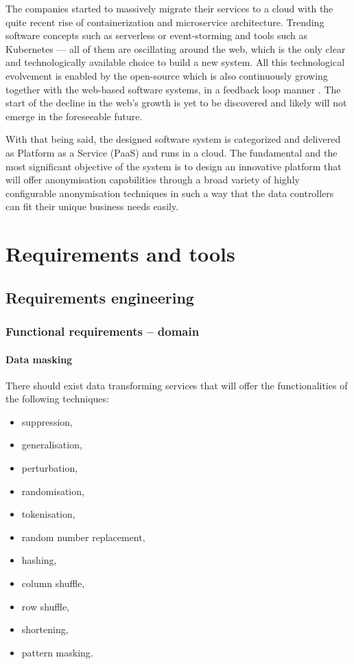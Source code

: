 \documentclass[a4paper,twoside,12pt]{book}
\begin{document}
The companies started to massively migrate their services to a cloud with the quite recent rise of containerization and microservice architecture. Trending software concepts such as serverless or event-storming and tools such as Kubernetes — all of them are oscillating around the web, which is the only clear and technologically available choice to build a new system. All this technological evolvement is enabled by the open-source which is also continuously growing together with the web-based software systems, in a feedback loop manner \cite{bib:distributed_systems}. The start of the decline in the web's growth is yet to be discovered and likely will not emerge in the foreseeable future.

With that being said, the designed software system is categorized and delivered as Platform as a Service (PaaS) and runs in a cloud. The fundamental and the most significant objective of the system is to design an innovative platform that will offer anonymisation capabilities through a broad variety of highly configurable anonymisation techniques in such a way that the data controllers can fit their unique business needs easily.

\chapter{Requirements and tools}

\section{Requirements engineering}

\subsection{Functional requirements – domain}

\subsubsection{Data masking}

There should exist data transforming services that will offer the functionalities of the following techniques:
\begin{itemize}
\item suppression,
\item generalisation,
\item perturbation,
\item randomisation,
\item tokenisation,
\item random number replacement,
\item hashing,
\item column shuffle,
\item row shuffle,
\item shortening,
\item pattern masking.
\end{itemize}
\end{document}
